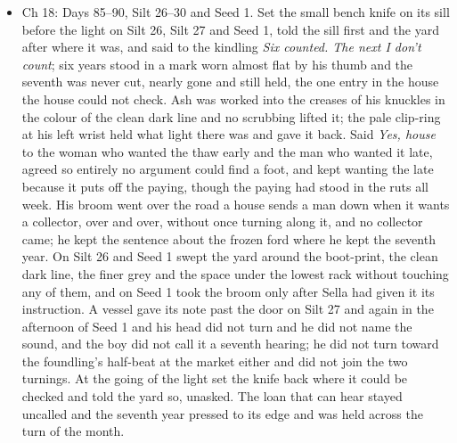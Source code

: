 \documentclass{design/chronicle}
\begin{document}
{\begin{itemize}[leftmargin=1.4em,itemsep=1pt,topsep=3pt,parsep=0pt]
\end{itemize}

\begin{itemize}[leftmargin=1.4em,itemsep=1pt,topsep=3pt,parsep=0pt]

\item Ch 18: Days 85–90, Silt 26–30 and Seed 1. Set the small bench knife on its sill before the light on Silt 26, Silt 27 and Seed 1, told the sill first and the yard after where it was, and said to the kindling \emph{Six counted. The next I don’t count}; six years stood in a mark worn almost flat by his thumb and the seventh was never cut, nearly gone and still held, the one entry in the house the house could not check. Ash was worked into the creases of his knuckles in the colour of the clean dark line and no scrubbing lifted it; the pale clip-ring at his left wrist held what light there was and gave it back. Said \emph{Yes, house} to the woman who wanted the thaw early and the man who wanted it late, agreed so entirely no argument could find a foot, and kept wanting the late because it puts off the paying, though the paying had stood in the ruts all week. His broom went over the road a house sends a man down when it wants a collector, over and over, without once turning along it, and no collector came; he kept the sentence about the frozen ford where he kept the seventh year. On Silt 26 and Seed 1 swept the yard around the boot-print, the clean dark line, the finer grey and the space under the lowest rack without touching any of them, and on Seed 1 took the broom only after Sella had given it its instruction. A vessel gave its note past the door on Silt 27 and again in the afternoon of Seed 1 and his head did not turn and he did not name the sound, and the boy did not call it a seventh hearing; he did not turn toward the foundling’s half-beat at the market either and did not join the two turnings. At the going of the light set the knife back where it could be checked and told the yard so, unasked. The loan that can hear stayed uncalled and the seventh year pressed to its edge and was held across the turn of the month.

\end{itemize}

\begin{itemize}[leftmargin=1.4em,itemsep=1pt,topsep=3pt,parsep=0pt]


\end{itemize}}
\end{document}
